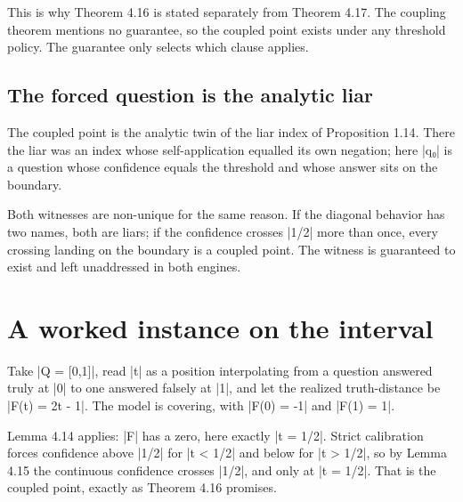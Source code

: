 \documentclass{memoir}
\begin{document}
This is why Theorem 4.16 is stated separately from Theorem 4.17. The coupling
theorem mentions no guarantee, so the coupled point exists under any threshold
policy. The guarantee only selects which clause applies.



\subsection{The forced question is the analytic liar}\label{Two--Schemas--of--Impossibility-005F-005F-005F--Machine--Checked--Limits--of--Trustworthy--Machine--Learning-005F-005F-005F--and--Why--They--Tighten--with--Capability----From--Logic--to--Analysis----The--topological--proof--of--the--trilemma----The--forced--question--is--the--analytic--liar}

The coupled point is the analytic twin of the liar index of Proposition 1.14.
There the liar was an index whose self-application equalled its own negation;
here \LeanVerb|q₀| is a question whose confidence equals the threshold and whose answer
sits on the boundary.

Both witnesses are non-unique for the same reason. If the diagonal behavior has
two names, both are liars; if the confidence crosses \LeanVerb|1/2| more than once, every
crossing landing on the boundary is a coupled point. The witness is guaranteed
to exist and left unaddressed in both engines.



\section{A worked instance on the interval}\label{Two--Schemas--of--Impossibility-005F-005F-005F--Machine--Checked--Limits--of--Trustworthy--Machine--Learning-005F-005F-005F--and--Why--They--Tighten--with--Capability----From--Logic--to--Analysis----A--worked--instance--on--the--interval}

Take \LeanVerb|Q = [0,1]|, read \LeanVerb|t| as a position interpolating from a question answered
truly at \LeanVerb|0| to one answered falsely at \LeanVerb|1|, and let the realized truth-distance
be \LeanVerb|F(t) = 2t - 1|. The model is covering, with \LeanVerb|F(0) = -1| and \LeanVerb|F(1) = 1|.

Lemma 4.14 applies: \LeanVerb|F| has a zero, here exactly \LeanVerb|t = 1/2|. Strict calibration
forces confidence above \LeanVerb|1/2| for \LeanVerb|t < 1/2| and below for \LeanVerb|t > 1/2|, so by Lemma
4.15 the continuous confidence crosses \LeanVerb|1/2|, and only at \LeanVerb|t = 1/2|. That is the
coupled point, exactly as Theorem 4.16 promises.
\end{document}
